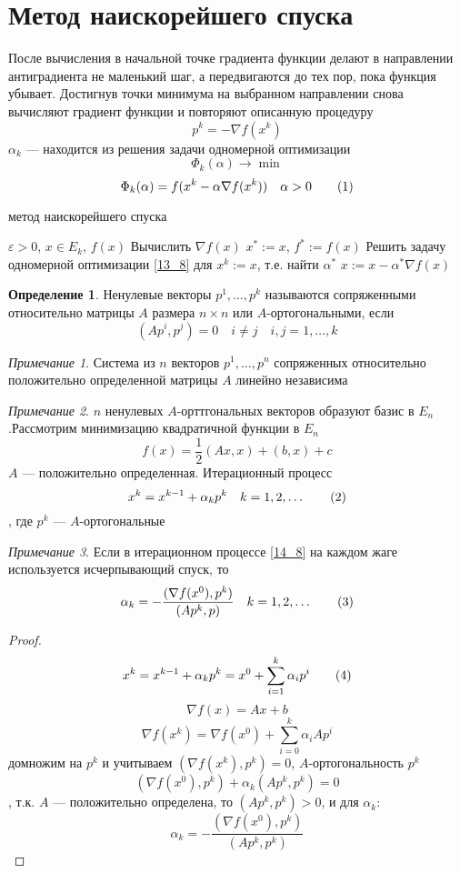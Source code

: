 \documentclass[english]{article}
\newcommand\addtag{\refstepcounter{equation}\tag{\theequation}}
\theoremstyle{plain}
\theoremstyle{remark}
\newtheorem*{remark}{Примечание}
\theoremstyle{definition}
\newtheorem*{definition}{Определение}
\newenvironment{rualgo}[1][]
  {\begin{algorithm}[#1]
     \selectlanguage{russian}%
     \floatname{algorithm}{Алгоритм}%
     \renewcommand{\algorithmicif}{{\color{red}\textbf{если}}}%
     \renewcommand{\algorithmicthen}{{\color{red}\textbf{тогда}}}%
     \renewcommand{\algorithmicelse}{{\color{red}\textbf{иначе}}}%
     \renewcommand{\algorithmicend}{{\color{red}\textbf{конец}}}%
     \renewcommand{\algorithmicfor}{{\color{red}\textbf{для}}}%
     \renewcommand{\algorithmicto}{{\color{red}\textbf{до}}}%
     \renewcommand{\algorithmicdo}{{\color{red}\textbf{делать}}}%
     \renewcommand{\algorithmicwhile}{{\color{red}\textbf{пока}}}%
     \renewcommand{\algorithmicrepeat}{{\color{red}\textbf{повторять}}}%
     \renewcommand{\algorithmicuntil}{{\color{red}\textbf{до тех пор пока}}}%
     \renewcommand{\algorithmicloop}{{\color{red}\textbf{повторять}}}%
     \renewcommand{\algorithmicnot}{{\color{blue}\textbf{не}}}%
     \renewcommand{\algorithmicand}{{\color{blue}\textbf{и}}}%
     \renewcommand{\algorithmicor}{{\color{blue}\textbf{или}}}%
     \renewcommand{\algorithmicrequire}{{\color{blue}\textbf{Ввод}}}%
     \renewcommand{\algorithmicrensure}{{\color{blue}\textbf{Вывод}}}%
     \renewcommand{\algorithmicreturn}{{\color{red}\textbf{Вернуть}}}%
     \renewcommand{\algorithmicrtrue}{{\color{blue}\textbf{истинна}}}%
     \renewcommand{\algorithmicrfalse}{{\color{blue}\textbf{ложь}}}%
  }
  {\end{algorithm}}
\begin{document}
\section{Метод наискорейшего спуска}
\label{sec:orgec93147}
После вычисления в начальной точке градиента функции делают в направлении антиградиента не маленький шаг, а передвигаются до тех пор, пока функция убывает. Достигнув точки минимума на выбранном направлении снова вычисляют градиент функции и повторяют описанную процедуру
\[ p^k = -\nabla f(x^k) \]
\(\alpha_k\) --- находится из решения задачи одномерной оптимизации
\[ \Phi_k(\alpha) \to \min \]
\[ \Phi_k(\alpha) = f(x^k - \alpha \nabla f(x^k)) \quad \alpha > 0 \addtag\label{13_8} \]
\begin{rualgo}[H]
\caption{метод наискорейшего спуска}
\begin{algorithmic}[1]
\REQUIRE \(\varepsilon > 0\), \(x \in E_k\), \(f(x)\)
\LOOP
  \STATE Вычислить \(\nabla f(x)\)
    \RETURN \(x^* := x\), \(f^* := f(x)\)
  \ENDIF
  \STATE Решить задачу одномерной оптимизации \ref{13_8} для \(x^k := x\), т.е. найти \(\alpha^*\)
  \STATE \(x := x - \alpha^* \nabla f(x)\)
\ENDLOOP
\end{algorithmic}
\end{rualgo}
\begin{definition}
Ненулевые векторы \(p^1,\dots, p^k\) называются сопряженными относительно матрицы \(A\) размера \(n \times n\) или \(A\)-ортогональными, если
\[ (Ap^i, p^j) = 0 \quad i\neq j \quad i, j = 1,\dots,k\]
\end{definition}
\begin{remark}
Система из \(n\) векторов \(p^1,\dots,p^n\) сопряженных относительно положительно определенной матрицы \(A\) линейно независима
\end{remark}
\begin{remark}
\(n\) ненулевых \(A\)-орттгональных векторов образуют базис в \(E_n\).Рассмотрим минимизацию квадратичной функции в \(E_n\)
\[ f(x) = \frac{1}{2} (Ax, x) + (b, x) + c \]
\(A\) --- положительно определенная. Итерационный процесс
\[ x^k = x^{k - 1} + \alpha_k p^k \quad k = 1,2,\dots \addtag\label{14_8} \]
, где \(p^k\) --- \(A\)-ортогональные
\end{remark}
\begin{remark}
Если в итерационном процессе \ref{14_8} на каждом жаге используется исчерпывающий спуск, то
\[ \alpha_k = -\frac{(\nabla f(x^0), p^k)}{(Ap^k, p)} \quad k = 1,2,\dots \addtag\label{15_8} \]
\end{remark}
\begin{proof}
\[ x^k = x^{k - 1} + \alpha_k p^k = x^0 + \sum_{i = 1}^{k} \alpha_i p^i \addtag\label{16_8} \]
\[ \nabla f(x) = Ax + b \]
\[ \nabla f(x^k) = \nabla f(x^0) + \sum_{i = 0}^k \alpha_i A p^i \]
домножим на \(p^k\) и учитываем \((\nabla f(x^k), p^k) = 0\), \(A\)-ортогональность \(p^k\)
\[ (\nabla f(x^0), p^k) + \alpha_k (A p^k, p^k) = 0 \]
, т.к. \(A\) --- положительно определена, то \((A p^k, p^k) > 0\), и для \(\alpha_k\):
\[ \alpha_k = -\frac{(\nabla f(x^0), p^k)}{(A p^k, p^k)} \]
\end{proof}
\end{document}
